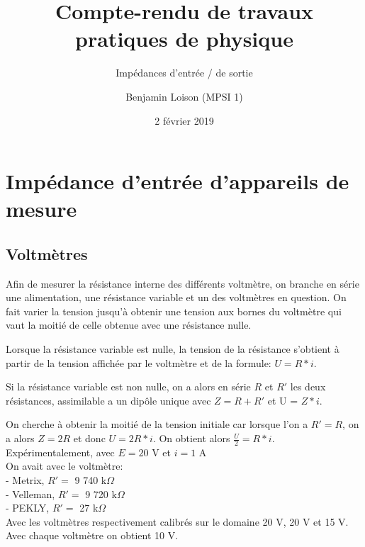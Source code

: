 \documentclass{scrartcl}
\begin{document}
	\title{\vspace{-2cm}Compte-rendu de travaux pratiques de physique}
	\subtitle{Impédances d'entrée / de sortie}
	\author{Benjamin Loison (MPSI 1)}
	\date{2 février 2019}
	\maketitle

	\section{Impédance d'entrée d'appareils de mesure}

		\subsection{Voltmètres}
		
			Afin de mesurer la résistance interne des différents voltmètre, on branche en série une alimentation, une résistance variable et un des voltmètres en question. On fait varier la tension jusqu'à obtenir une tension aux bornes du voltmètre qui vaut la moitié de celle obtenue avec une résistance nulle.
			
			
		Lorsque la résistance variable est nulle, la tension de la résistance s'obtient à partir de la tension affichée par le voltmètre et de la formule: $U = R * i$.
		
		
		Si la résistance variable est non nulle, on a alors en série $R$ et $R'$ les deux résistances, assimilable a un dipôle unique avec $Z = R + R'$ et U = $Z * i$.
		
		On cherche à obtenir la moitié de la tension initiale car lorsque l'on a $R' = R$, on a alors $Z = 2R$ et donc $U = 2 R * i$. On obtient alors $\frac{U}{2} = R * i$.\\
		
		Expérimentalement, avec $E = 20$ V et $i = 1$ A\\ %
		On avait avec le voltmètre:\\
		- Metrix, $R' = $ 9 740 k$\Omega$\\
		- Velleman, $R' = $ 9 720 k$\Omega$\\
		- PEKLY, $R' = $ 27 k$\Omega$\\
		Avec les voltmètres respectivement calibrés sur le domaine 20 V, 20 V et 15 V.\\
		Avec chaque voltmètre on obtient 10 V.
		
\end{document}
